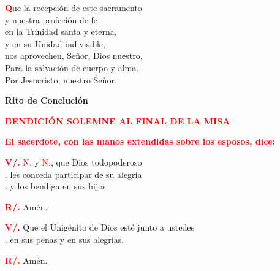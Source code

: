 \documentclass[12pt, letterpaper, spanish]{report}
\begin{document}
\Large \lettrine[lines=1]{\bfseries \textcolor{red}{Q}}{}ue la recepci\'on de este sacramento\\
y nuestra profeci\'on de fe\\
en la Trinidad santa y eterna,\\
y en su Unidad indivisible,\\
nos aprovechen, Se\~nor, Dios nuestro,\\
Para la salvaci\'on de cuerpo y alma.\\
Por Jesucristo, nuestro Se\~nor.\newline

\newpage

\begin{center}
\Huge {\bfseries Rito de Concluci\'on}
\end{center}

\Large {\bfseries \textcolor{red}{BENDICI\'ON SOLEMNE AL FINAL DE LA MISA}} \newline

\large{\bfseries \textcolor{red}{El sacerdote, con las manos extendidas sobre los esposos, dice:}}\newline

\Large \hspace{-0.9cm} {\bfseries \textcolor{red}{V/.}} \hspace{0.5cm} \textcolor{red}{N.} y \textcolor{red}{N.}, que Dios todopoderoso\\
.\hspace{1.5cm} les conceda participar de su alegr\'ia\\
.\hspace{1.5cm} y los bendiga en sus hijos.\newline

\Large \hspace{-0.9cm} {\bfseries \textcolor{red}{R/.}} \hspace{0.5cm} Am\'en.\newline

\Large \hspace{-0.9cm} {\bfseries \textcolor{red}{V/.}} \hspace{0.5cm} Que el Unig\'enito de Dios est\'e junto a ustedes\\
.\hspace{1.5cm} en sus penas y en sus alegr\'ias.\newline

\Large \hspace{-0.9cm} {\bfseries \textcolor{red}{R/.}} \hspace{0.5cm} Am\'en.\newline
\end{document}
